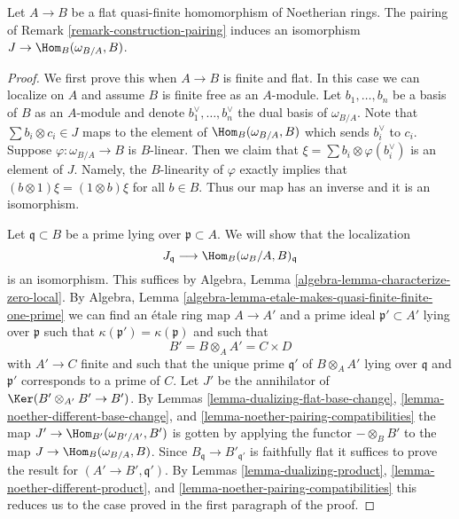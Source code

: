 \begin{lemma}
\label{lemma-noether-pairing-flat-quasi-finite}
Let $A \to B$ be a flat quasi-finite homomorphism of Noetherian rings.
The pairing of Remark \ref{remark-construction-pairing} induces an isomorphism
$J \to \Hom_B(\omega_{B/A}, B)$.
\end{lemma}

\begin{proof}
We first prove this when $A \to B$ is finite and flat. In this case we can
localize on $A$ and assume $B$ is finite free as an $A$-module. Let
$b_1, \ldots, b_n$ be a basis of $B$ as an $A$-module and denote
$b_1^\vee, \ldots, b_n^\vee$ the dual basis of $\omega_{B/A}$. Note that
$\sum b_i \otimes c_i \in J$ maps to the element of $\Hom_B(\omega_{B/A}, B)$
which sends $b_i^\vee$ to $c_i$. Suppose $\varphi : \omega_{B/A} \to B$
is $B$-linear. Then we claim that $\xi = \sum b_i \otimes \varphi(b_i^\vee)$
is an element of $J$. Namely, the $B$-linearity of $\varphi$
exactly implies that $(b \otimes 1)\xi = (1 \otimes b)\xi$ for all $b \in B$.
Thus our map has an inverse and it is an isomorphism.

\medskip\noindent
Let $\mathfrak q \subset B$ be a prime lying over $\mathfrak p \subset A$.
We will show that the localization
$$
J_\mathfrak q
\longrightarrow
\Hom_B(\omega_B/A, B)_\mathfrak q
$$
is an isomorphism.
This suffices by Algebra, Lemma \ref{algebra-lemma-characterize-zero-local}.
By
Algebra, Lemma \ref{algebra-lemma-etale-makes-quasi-finite-finite-one-prime}
we can find an \'etale ring map $A \to A'$ and a prime
ideal $\mathfrak p' \subset A'$ lying over $\mathfrak p$
such that $\kappa(\mathfrak p') = \kappa(\mathfrak p)$ and
such that
$$
B' = B \otimes_A A' = C \times D
$$
with $A' \to C$ finite and such that the unique prime $\mathfrak q'$
of $B \otimes_A A'$ lying over $\mathfrak q$ and $\mathfrak p'$
corresponds to a prime of $C$. Let $J'$ be the annihilator of
$\Ker(B' \otimes_{A'} B' \to B')$. By
Lemmas \ref{lemma-dualizing-flat-base-change},
\ref{lemma-noether-different-base-change}, and
\ref{lemma-noether-pairing-compatibilities}
the map $J' \to \Hom_{B'}(\omega_{B'/A'}, B')$
is gotten by applying the functor $- \otimes_B B'$
to the map $J \to \Hom_B(\omega_{B/A}, B)$.
Since $B_\mathfrak q \to B'_{\mathfrak q'}$ is faithfully flat
it suffices to prove the result for $(A' \to B', \mathfrak q')$.
By Lemmas \ref{lemma-dualizing-product},
\ref{lemma-noether-different-product}, and
\ref{lemma-noether-pairing-compatibilities}
this reduces us to the case proved in the first
paragraph of the proof.
\end{proof}

